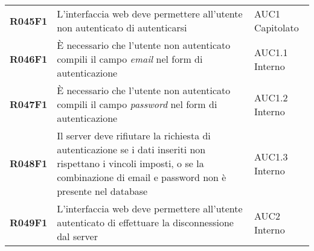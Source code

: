 \documentclass[../analisi-dei-requisiti.tex]{subfiles}
\begin{document}
\begin{longtable}[H]{>{\centering\bfseries}m{3cm} >{\centering}m{10cm} >{\centering\arraybackslash}m{3cm}}
  R045F1                               & L'interfaccia web deve permettere all'utente non autenticato di autenticarsi                                                                                                                            & AUC1 Capitolato               \\
  R046F1                               & È necessario che l'utente non autenticato compili il campo \textit{email} nel form di autenticazione                                                                                                    & AUC1.1 Interno                \\
  R047F1                               & È necessario che l'utente non autenticato compili il campo \textit{password} nel form di autenticazione                                                                                                 & AUC1.2 Interno                \\
  R048F1                               & Il server deve rifiutare la richiesta di autenticazione se i dati inseriti non rispettano i vincoli imposti, o se la combinazione di email e password non è presente nel database                       & AUC1.3 Interno                \\
  R049F1                               & L'interfaccia web deve permettere all'utente autenticato di effettuare la disconnessione dal server                                                                                                     & AUC2 Interno                  \\


\end{longtable}
\end{document}
